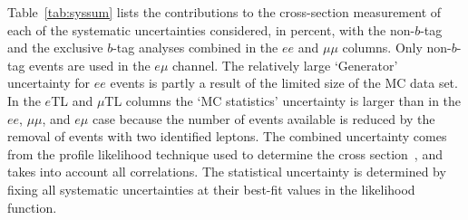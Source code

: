 Table~\ref{tab:syssum} lists the contributions to the cross-section
measurement of each of the systematic uncertainties considered, in
percent, with the non-$b$-tag and the exclusive $b$-tag analyses
combined in the $ee$ and $\mu\mu$ columns.  Only non-$b$-tag events
are used in the $e\mu$ channel.  The relatively large `Generator'
uncertainty for $ee$ events is partly a result of the limited size
of the MC data set.  In the $e$TL and $\mu$TL columns the `MC
statistics' uncertainty is larger than in the $ee$, $\mu\mu$, and
$e\mu$ case because the number of events available is reduced by the
removal of events with two identified leptons.  The combined
uncertainty comes from the profile likelihood technique used to
determine the cross section~\cite{ATL-CONF-2011-034}, and takes into
account all correlations.  The statistical uncertainty is determined
by fixing all systematic uncertainties at their best-fit values in
the likelihood function.

